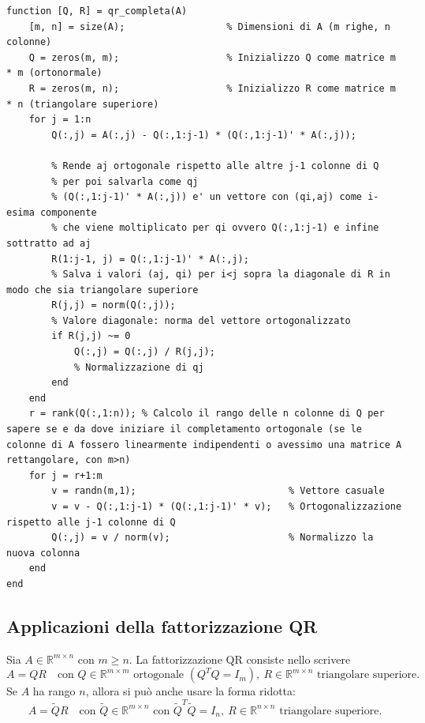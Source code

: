 \documentclass[12pt,a4paper]{article}
\begin{document}
\vspace{1em}
\begin{lstlisting}
function [Q, R] = qr_completa(A)
    [m, n] = size(A);                  % Dimensioni di A (m righe, n colonne)
    Q = zeros(m, m);                   % Inizializzo Q come matrice m * m (ortonormale)
    R = zeros(m, n);                   % Inizializzo R come matrice m * n (triangolare superiore)
    for j = 1:n
        Q(:,j) = A(:,j) - Q(:,1:j-1) * (Q(:,1:j-1)' * A(:,j));
        
        % Rende aj ortogonale rispetto alle altre j-1 colonne di Q
        % per poi salvarla come qj
        % (Q(:,1:j-1)' * A(:,j)) e' un vettore con (qi,aj) come i-esima componente
        % che viene moltiplicato per qi ovvero Q(:,1:j-1) e infine sottratto ad aj
        R(1:j-1, j) = Q(:,1:j-1)' * A(:,j);
        % Salva i valori (aj, qi) per i<j sopra la diagonale di R in modo che sia triangolare superiore
        R(j,j) = norm(Q(:,j));          
        % Valore diagonale: norma del vettore ortogonalizzato
        if R(j,j) ~= 0
            Q(:,j) = Q(:,j) / R(j,j);  
            % Normalizzazione di qj
        end
    end
    r = rank(Q(:,1:n)); % Calcolo il rango delle n colonne di Q per sapere se e da dove iniziare il completamento ortogonale (se le colonne di A fossero linearmente indipendenti o avessimo una matrice A rettangolare, con m>n)
    for j = r+1:m
        v = randn(m,1);                           % Vettore casuale
        v = v - Q(:,1:j-1) * (Q(:,1:j-1)' * v);   % Ortogonalizzazione rispetto alle j-1 colonne di Q
        Q(:,j) = v / norm(v);                     % Normalizzo la nuova colonna
    end
end
\end{lstlisting}

\newpage
\subsection*{Applicazioni della fattorizzazione QR}

Sia \( A \in \mathbb{R}^{m \times n} \) con \( m \geq n \). La fattorizzazione QR consiste nello scrivere
\[
A = QR \quad \text{con } Q \in \mathbb{R}^{m \times m} \text{ ortogonale } (Q^T Q = I_m),\ R \in \mathbb{R}^{m \times n} \text{ triangolare superiore}.
\]
Se \( A \) ha rango \( n \), allora si può anche usare la forma ridotta:
\[
A = \tilde{Q} R \quad \text{con } \tilde{Q} \in \mathbb{R}^{m \times n} \text{ con } \tilde{Q}^T \tilde{Q} = I_n,\ R \in \mathbb{R}^{n \times n} \text{ triangolare superiore}.
\]
\end{document}

